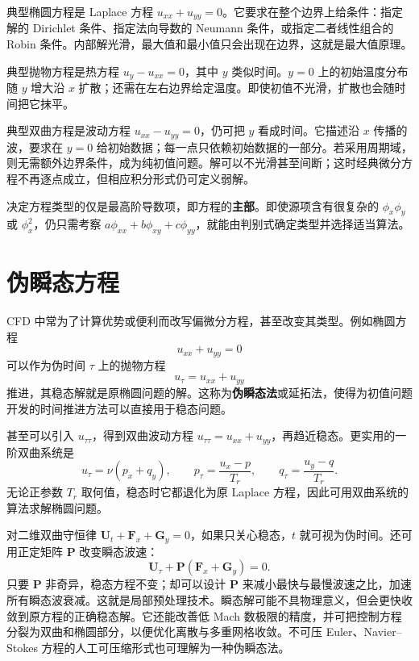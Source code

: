 \documentclass[11pt,a4paper,openany,fontset=none]{ctexbook}
\begin{document}
典型椭圆方程是 Laplace 方程 $u_{xx}+u_{yy}=0$。它要求在整个边界上给条件：指定解的 Dirichlet 条件、指定法向导数的 Neumann 条件，或指定二者线性组合的 Robin 条件。内部解光滑，最大值和最小值只会出现在边界，这就是最大值原理。

典型抛物方程是热方程 $u_y-u_{xx}=0$，其中 $y$ 类似时间。$y=0$ 上的初始温度分布随 $y$ 增大沿 $x$ 扩散；还需在左右边界给定温度。即使初值不光滑，扩散也会随时间把它抹平。

典型双曲方程是波动方程 $u_{xx}-u_{yy}=0$，仍可把 $y$ 看成时间。它描述沿 $x$ 传播的波，要求在 $y=0$ 给初始数据；每一点只依赖初始数据的一部分。若采用周期域，则无需额外边界条件，成为纯初值问题。解可以不光滑甚至间断；这时经典微分方程不再逐点成立，但相应积分形式仍可定义弱解。

决定方程类型的仅是最高阶导数项，即方程的\textbf{主部}。即使源项含有很复杂的 $\phi_x\phi_y$ 或 $\phi_x^2$，仍只需考察 $a\phi_{xx}+b\phi_{xy}+c\phi_{yy}$，就能由判别式确定类型并选择适当算法。

\section{伪瞬态方程}

CFD 中常为了计算优势或便利而改写偏微分方程，甚至改变其类型。例如椭圆方程
\begin{equation}u_{xx}+u_{yy}=0\end{equation}
可以作为伪时间 $\tau$ 上的抛物方程
\begin{equation}u_\tau=u_{xx}+u_{yy} \tag{1.18.2}\end{equation}
推进，其稳态解就是原椭圆问题的解。这称为\textbf{伪瞬态法}或延拓法，使得为初值问题开发的时间推进方法可以直接用于稳态问题。

甚至可以引入 $u_{\tau\tau}$，得到双曲波动方程 $u_{\tau\tau}=u_{xx}+u_{yy}$，再趋近稳态。更实用的一阶双曲系统是
\begin{equation}
 u_\tau=\nu(p_x+q_y),\qquad p_\tau=\frac{u_x-p}{T_r},\qquad q_\tau=\frac{u_y-q}{T_r}. \tag{1.18.4}
\end{equation}
无论正参数 $T_r$ 取何值，稳态时它都退化为原 Laplace 方程，因此可用双曲系统的算法求解椭圆问题。

对二维双曲守恒律 $\bm U_t+\bm F_x+\bm G_y=0$，如果只关心稳态，$t$ 就可视为伪时间。还可用正定矩阵 $\bm P$ 改变瞬态波速：
\begin{equation}
 \bm U_\tau+\bm P(\bm F_x+\bm G_y)=0. \tag{1.18.7}
\end{equation}
只要 $\bm P$ 非奇异，稳态方程不变；却可以设计 $\bm P$ 来减小最快与最慢波速之比，加速所有瞬态波衰减。这就是局部预处理技术。瞬态解可能不具物理意义，但会更快收敛到原方程的正确稳态解。它还能改善低 Mach 数极限的精度，并可把控制方程分裂为双曲和椭圆部分，以便优化离散与多重网格收敛。不可压 Euler、Navier--Stokes 方程的人工可压缩形式也可理解为一种伪瞬态法。
\end{document}
